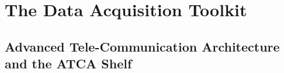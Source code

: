 \section{The Data Acquisition Toolkit}





\subsection{Advanced Tele-Communication Architecture and the ATCA Shelf}
\label{sec:ATCA}

